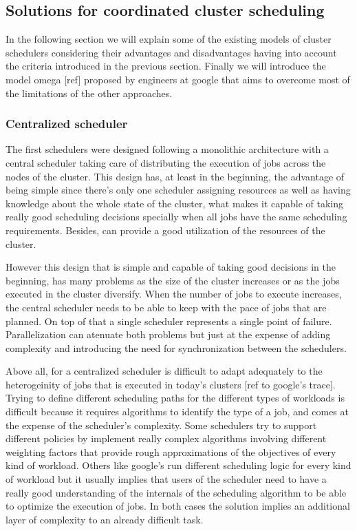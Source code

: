 \documentclass{svjour3}                     %
\begin{document}
\subsection{Solutions for coordinated cluster scheduling}

In the following section we will explain some of the existing models
of cluster schedulers considering their advantages and disadvantages
having into account the criteria introduced in the previous
section. Finally we will introduce the model omega [ref] proposed by
engineers at google that aims to overcome most of the
limitations of the other approaches.

\subsubsection{Centralized scheduler}

The first schedulers were designed following a monolithic architecture
with a central scheduler taking care of distributing the execution
of jobs across the nodes of the cluster. This design has, at least in
the beginning, the advantage of being simple since there's only one
scheduler assigning resources as well as having knowledge about the
whole state of the cluster, what makes it capable of taking really
good scheduling decisions specially when all jobs have the same
scheduling requirements. Besides, can provide a good
utilization of the resources of the cluster.

However this design that is simple and capable of taking good
decisions in the beginning, has many problems as the size of the
cluster increases or as the jobs executed in the cluster
diversify. When the number of jobs to execute increases, the central
scheduler needs to be able to keep with the pace of jobs that are
planned. On top of that a single scheduler represents a single point
of failure. Parallelization can atenuate both problems but just at the
expense of adding complexity and introducing the need for synchronization
between the schedulers.

Above all, for a centralized scheduler is difficult to adapt
adequately to the heterogeinity of jobs that is executed in today's
clusters [ref to google's trace]. Trying to define different
scheduling paths for the different types of workloads is difficult
because it requires algorithms to identify the type of a job, and comes
at the expense of the scheduler's complexity. Some schedulers try to
support different policies by implement really complex algorithms
involving different weighting factors that provide rough
approximations of the objectives of every kind of workload. Others
like google's run different scheduling logic for every kind of
workload but it usually implies that users of the scheduler need to
have a really good understanding of the internals of the scheduling
algorithm to be able to optimize the execution of jobs. In both cases
the solution implies an additional layer of complexity to an already
difficult task.
\end{document}
